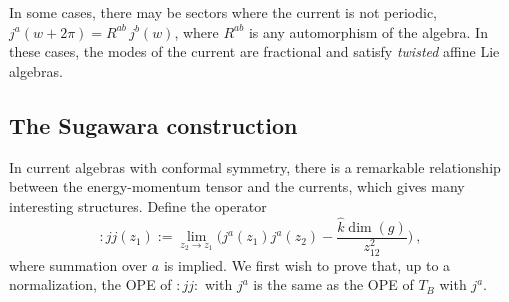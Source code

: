 In some cases, there may be sectors where the current is not periodic, $j^{a}(w+2\pi)=R^{ab}\,j^{b}(w)$, where $R^{ab}$ is any automorphism of the algebra. In these cases, the modes of the current are fractional and satisfy \emph{twisted} affine Lie algebras.

\subsection*{The Sugawara construction}

In current algebras with conformal symmetry, there is a remarkable relationship between the energy-momentum tensor and the currents, which gives many interesting structures. Define the operator
\begin{equation}
	:jj(z_{1}):=\lim_{z_{2}\to z_{1}}\Biggl(j^{a}(z_{1})j^{a}(z_{2})-\frac{\hat{k}\operatorname{dim}(g)}{z_{12}^{2}}\Biggr) \:, \label{11.5.18}
\end{equation}
where summation over $a$ is implied. We first wish to prove that, up to a normalization, the OPE of $:jj: $ with $j^{a}$ is the same as the OPE of $T_{B}$ with $j^{a}$. 

